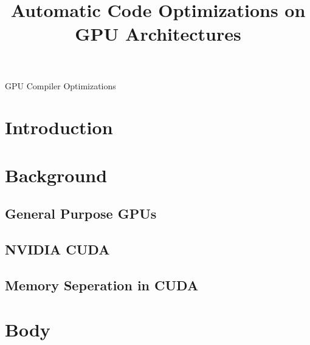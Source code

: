 \documentclass[conference]{IEEEtran}
\begin{document}
\title{Automatic Code Optimizations on GPU Architectures}

\author{
}


\maketitle

\begin{abstract}

\end{abstract}

\begin{IEEEkeywords}
GPU Compiler Optimizations
\end{IEEEkeywords}

\section{Introduction}

\section{Background}

\subsection{General Purpose GPUs}


\subsection{NVIDIA CUDA}


\subsection{Memory Seperation in CUDA}


\section{Body}
\end{document}
